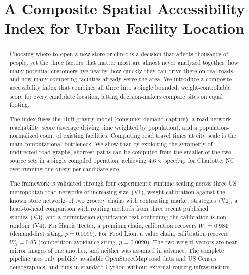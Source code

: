 \documentclass[conference]{IEEEtran}
\begin{document}
\title{A Composite Spatial Accessibility Index for Urban Facility Location}

\author{
}

\maketitle

\begin{abstract}
Choosing where to open a new store or clinic is a decision that affects
thousands of people, yet the three factors that matter most are almost
never analyzed together: how many potential customers live nearby, how
quickly they can drive there on real roads, and how many competing
facilities already serve the area. We introduce a composite
accessibility index that combines all three into a single bounded,
weight-controllable score for every candidate location, letting
decision-makers compare sites on equal footing.

The index fuses the Huff gravity model (consumer demand capture), a
road-network reachability score (average driving time weighted by
population), and a population-normalized count of existing facilities.
Computing road travel times at city scale is the main computational
bottleneck. We show that by exploiting the symmetry of undirected road
graphs, shortest paths can be computed from the smaller of the two
source sets in a single compiled operation, achieving $4.6\times$
speedup for Charlotte, NC over running one query per candidate site.

The framework is validated through four experiments: runtime scaling
across three US metropolitan road networks of increasing size~(V1),
weight calibration against the known store networks of two grocery
chains with contrasting market strategies~(V2), a head-to-head
comparison with routing methods from three recent published
studies~(V3), and a permutation significance test confirming the
calibration is non-random~(V4). For Harris Teeter, a premium chain,
calibration recovers $W_1 = 0.984$ (demand-first siting,
$p = 0.0099$). For Food Lion, a value chain, calibration recovers
$W_3 = 0.85$ (competition-avoidance siting, $p = 0.0020$). The two
weight vectors are near mirror images of one another, and neither was
assumed in advance. The complete pipeline uses only publicly available
OpenStreetMap road data and US Census demographics, and runs in
standard Python without external routing infrastructure.
\end{abstract}
\end{document}
